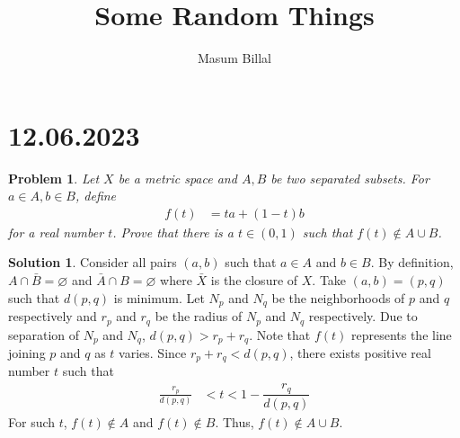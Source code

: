 \documentclass{article}
\title{Some Random Things}
\author{Masum Billal}
\newtheorem{problem}{Problem}
\theoremstyle{definition}
\newtheorem*{solution}{Solution}
\begin{document}
	\maketitle

	\section{12.06.2023}
	\begin{problem}
		Let $X$ be a metric space and $A,B$ be two separated subsets. For $a\in A, b\in B$, define
			\begin{align*}
				f(t)
					& = ta+(1-t)b
			\end{align*}
		for a real number $t$. Prove that there is a $t\in(0,1)$ such that $f(t)\not\in A\cup B$.
	\end{problem}

	\begin{solution}
		Consider all pairs $(a,b)$ such that $a\in A$ and $b\in B$. By definition, $A\cap \bar{B}=\varnothing$ and $\bar{A}\cap B=\varnothing$ where $\bar{X}$ is the closure of $X$. Take $(a,b)=(p,q)$ such that $d(p,q)$ is minimum. Let $N_{p}$ and $N_{q}$ be the neighborhoods of $p$ and $q$ respectively and $r_{p}$ and $r_{q}$ be the radius of $N_{p}$ and $N_{q}$ respectively. Due to separation of $N_{p}$ and $N_{q}$, $d(p,q)>r_{p}+r_{q}$. Note that $f(t)$ represents the line joining $p$ and $q$ as $t$ varies. Since $r_{p}+r_{q}<d(p,q)$, there exists positive real number $t$ such that
			\begin{align*}
				\frac{r_{p}}{d(p,q)}
					& < t<1-\dfrac{r_{q}}{d(p,q)}
			\end{align*}
		For such $t$, $f(t)\not\in A$ and $f(t)\not\in B$. Thus, $f(t)\not\in A\cup B$.
	\end{solution}
\end{document}
